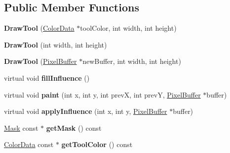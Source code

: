 \subsection*{Public Member Functions}
\begin{DoxyCompactItemize}
\item 
\hypertarget{classDrawTool_aa21e3a5373ba9e4e43d6e56eec82b32d}{{\bfseries Draw\-Tool} (\hyperlink{classColorData}{Color\-Data} $\ast$tool\-Color, int width, int height)}\label{classDrawTool_aa21e3a5373ba9e4e43d6e56eec82b32d}

\item 
\hypertarget{classDrawTool_aa1816d6699a835d9c7619ee5c97be9d1}{{\bfseries Draw\-Tool} (int width, int height)}\label{classDrawTool_aa1816d6699a835d9c7619ee5c97be9d1}

\item 
\hypertarget{classDrawTool_a521ad2f183dd3354de1dd163140e8b1d}{{\bfseries Draw\-Tool} (\hyperlink{classPixelBuffer}{Pixel\-Buffer} $\ast$new\-Buffer, int width, int height)}\label{classDrawTool_a521ad2f183dd3354de1dd163140e8b1d}

\item 
\hypertarget{classDrawTool_ae202bc193ba721452e81f34b6c2e6e35}{virtual void {\bfseries fill\-Influence} ()}\label{classDrawTool_ae202bc193ba721452e81f34b6c2e6e35}

\item 
\hypertarget{classDrawTool_a65dbb2f006efc9c6053d01df75eff5a9}{virtual void {\bfseries paint} (int x, int y, int prev\-X, int prev\-Y, \hyperlink{classPixelBuffer}{Pixel\-Buffer} $\ast$buffer)}\label{classDrawTool_a65dbb2f006efc9c6053d01df75eff5a9}

\item 
\hypertarget{classDrawTool_ac60a70d91e81163d413b99382ac4255b}{virtual void {\bfseries apply\-Influence} (int x, int y, \hyperlink{classPixelBuffer}{Pixel\-Buffer} $\ast$buffer)}\label{classDrawTool_ac60a70d91e81163d413b99382ac4255b}

\item 
\hypertarget{classDrawTool_ad11d4e44fcd2caf774e18ce5b2986865}{\hyperlink{classMask}{Mask} const $\ast$ {\bfseries get\-Mask} () const }\label{classDrawTool_ad11d4e44fcd2caf774e18ce5b2986865}

\item 
\hypertarget{classDrawTool_a00485271784acd5acc75840a7a17eb2e}{\hyperlink{classColorData}{Color\-Data} const $\ast$ {\bfseries get\-Tool\-Color} () const }\label{classDrawTool_a00485271784acd5acc75840a7a17eb2e}


\end{DoxyCompactItemize}

